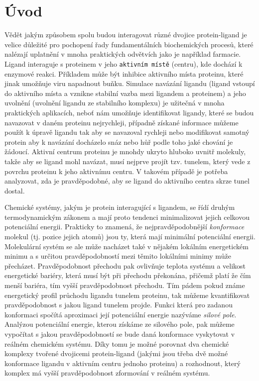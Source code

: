 \chapter*{Úvod}

Vědět jakým způsobem spolu budou interagovat různé dvojice protein-ligand je
velice důležité pro pochopení řady fundamentálních biochemických procesů, které
nalézají uplatnění v mnoha praktických odvětvích jako je například farmacie.
Ligand interaguje s proteinem v jeho \texttt{aktivním místě} (centru), kde dochází
k enzymové reakci. Příkladem může být inhibice aktivního místa proteinu, které
jinak umožňuje viru napadnout buňku. Simulace navázání ligandu (ligand vstoupí
do aktivního místa a vznikne stabilní vazba mezi ligandem a proteinem) a jeho
uvolnění (uvolnění ligandu ze stabilního komplexu) je užitečná v mnoha praktických
aplikacích, neboť nám umožňuje identifikovat ligandy, které se budou navazovat
v daném proteinu nejrychleji, případně získané informace můžeme použít k úpravě
ligandu tak aby se navazoval rychleji nebo modifikovat samotný protein aby k
navázání docházelo snáz nebo hůř podle toho jaké chování je žádoucí. Aktivní
centrum proteinu je mnohdy ukryto hluboko uvnitř molekuly, takže aby se ligand
mohl navázat, musí nejprve projít tzv. tunelem, který vede z povrchu proteinu
k jeho aktivnímu centru. V takovém případě je potřeba analyzovat, zda je
pravděpodobné, aby se ligand do aktivního centra skrze tunel dostal.

Chemické systémy, jakým je protein interagující s ligandem, se řídí druhým
termodynamickým zákonem a mají proto tendenci minimalizovat jejich
celkovou potenciální energii. Prakticky to znamená, že nejpravděpodobnější
\textit{konformace} molekul (tj. pozice jejich atomů) jsou ty, která mají minimální
potenciální energii. Molekulární systém se ale může nacházet také v nějakém
lokálním energetickém minimu a s určitou pravděpodobností mezi těmito lokálními
minimy může přecházet. Pravděpodobnost přechodu pak ovlivňuje teplota systému a
velikost energetické bariéry, která musí být při přechodu překonána, přičemž platí
že čím menší bariéra, tím vyšší pravděpodobnost přechodu. Tím pádem pokud známe
energetický profil průchodu ligandu tunelem proteinu, tak můžeme kvantifikovat
pravděpodobnost s jakou ligand tunelem projde. Funkci která pro zadanou konformaci
spočítá aproximaci její potenciální energie nazýváme \textit{silové pole}. Analýzou
potenciální energie, kterou získáme ze silového pole, pak můžeme vypočítat
s jakou pravděpodobností se bude daná konformace vyskytovat v reálném chemickém
systému. Díky tomu je možné porovnat dva chemické komplexy tvořené
dvojicemi protein-ligand (jakými jsou třeba dvě možné konformace ligandu
v aktivním centru jednoho proteinu) a rozhodnout, který komplex má vyšší
pravděpodobnost zformování v reálném systému.

